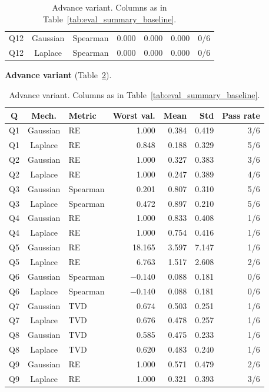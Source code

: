 \documentclass[12pt,letterpaper]{article}
\begin{document}
\begin{table}[H]
\begin{tabular}{@{}cclrrrr@{}}
Q12 & Gaussian & Spearman & 0.000 & 0.000 & 0.000 & 0/6 \\
Q12 & Laplace  & Spearman & 0.000 & 0.000 & 0.000 & 0/6 \\
\bottomrule
\end{tabular}
\vspace{0.5em}
\caption{Advance variant. Columns as in Table~\ref{tab:eval_summary_baseline}.}
\label{tab:eval_summary_advance}
\smallskip
\noindent\textbf{Advance variant} (Table~\ref{tab:eval_summary_advance}).\\
\footnotesize
\begin{tabular}{@{}cclrrrr@{}}
\toprule
\textbf{Q} & \textbf{Mech.} & \textbf{Metric} & \textbf{Worst val.} & \textbf{Mean} & \textbf{Std} & \textbf{Pass rate} \\
\midrule
Q1 & Gaussian & RE       & 1.000  & 0.384 & 0.419 & 3/6 \\
Q1 & Laplace  & RE       & 0.848  & 0.188 & 0.329 & 5/6 \\
Q2 & Gaussian & RE       & 1.000  & 0.327 & 0.383 & 3/6 \\
Q2 & Laplace  & RE       & 1.000  & 0.247 & 0.389 & 4/6 \\
Q3 & Gaussian & Spearman & 0.201  & 0.807 & 0.310 & 5/6 \\
Q3 & Laplace  & Spearman & 0.472  & 0.897 & 0.210 & 5/6 \\
Q4 & Gaussian & RE       & 1.000  & 0.833 & 0.408 & 1/6 \\
Q4 & Laplace  & RE       & 1.000  & 0.754 & 0.416 & 1/6 \\
Q5 & Gaussian & RE       & 18.165 & 3.597 & 7.147 & 1/6 \\
Q5 & Laplace  & RE       & 6.763  & 1.517 & 2.608 & 2/6 \\
Q6 & Gaussian & Spearman & $-0.140$ & 0.088 & 0.181 & 0/6 \\
Q6 & Laplace  & Spearman & $-0.140$ & 0.088 & 0.181 & 0/6 \\
Q7 & Gaussian & TVD      & 0.674  & 0.503 & 0.251 & 1/6 \\
Q7 & Laplace  & TVD      & 0.676  & 0.478 & 0.257 & 1/6 \\
Q8 & Gaussian & TVD      & 0.585  & 0.475 & 0.233 & 1/6 \\
Q8 & Laplace  & TVD      & 0.620  & 0.483 & 0.240 & 1/6 \\
Q9 & Gaussian & RE       & 1.000  & 0.571 & 0.479 & 2/6 \\
Q9 & Laplace  & RE       & 1.000  & 0.321 & 0.393 & 3/6 \\

\end{tabular}
\end{table}
\end{document}
